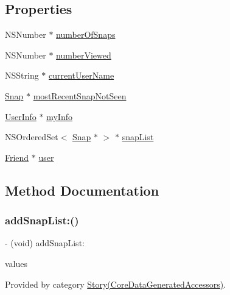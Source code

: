 \subsection*{Properties}
\begin{DoxyCompactItemize}
\item 
N\+S\+Number $\ast$ \hyperlink{interface_story_a274932e7cc41214730b2b9bd11b31de2}{number\+Of\+Snaps}
\item 
N\+S\+Number $\ast$ \hyperlink{interface_story_a5810378b61cd9f5b2b951440c8ca2db5}{number\+Viewed}
\item 
N\+S\+String $\ast$ \hyperlink{interface_story_a1d58b14f07e9d3fbab4a4703a066bfc2}{current\+User\+Name}
\item 
\hyperlink{interface_snap}{Snap} $\ast$ \hyperlink{interface_story_a3034a750fc40fc2b0985d5a7f5213909}{most\+Recent\+Snap\+Not\+Seen}
\item 
\hyperlink{interface_user_info}{User\+Info} $\ast$ \hyperlink{interface_story_a5f52fcbdeb0aabdd93d2a4312bb9759e}{my\+Info}
\item 
N\+S\+Ordered\+Set$<$ \hyperlink{interface_snap}{Snap} $\ast$ $>$ $\ast$ \hyperlink{interface_story_a4616dbf24fe3c6c6f5482aea92cedd57}{snap\+List}
\item 
\hyperlink{interface_friend}{Friend} $\ast$ \hyperlink{interface_story_a121feaf5c67f45ee0541af06a20407af}{user}
\end{DoxyCompactItemize}


\subsection{Method Documentation}
\hypertarget{interface_story_a3464007fbbd05bb5bd748f811a83e103}{}\label{interface_story_a3464007fbbd05bb5bd748f811a83e103} 
\subsubsection{\texorpdfstring{add\+Snap\+List\+:()}{addSnapList:()}}
{\footnotesize\ttfamily -\/ (void) add\+Snap\+List\+: \begin{DoxyParamCaption}\item[{(N\+S\+Ordered\+Set$<$ \hyperlink{interface_snap}{Snap} $\ast$ $>$ $\ast$)}]{values }\end{DoxyParamCaption}}



Provided by category \hyperlink{category_story_07_core_data_generated_accessors_08_a3464007fbbd05bb5bd748f811a83e103}{Story(\+Core\+Data\+Generated\+Accessors)}.

